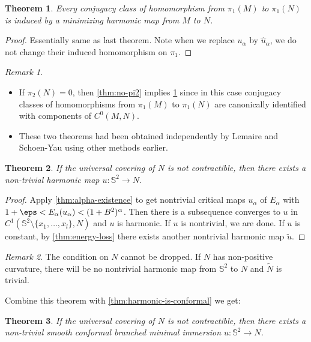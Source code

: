 \documentclass[UTF8,12pt]{article}
\theoremstyle{plain}\newtheorem{theorem}{Theorem}
\theoremstyle{definition}\newtheorem{definition}[theorem]{Definition}
\theoremstyle{definition}\newtheorem{example}[theorem]{Example}
\theoremstyle{plain}\newtheorem{axiom}[theorem]{Axiom}
\theoremstyle{plain}\newtheorem{assertion}[theorem]{Assertion}
\theoremstyle{plain}\newtheorem{corollary}[theorem]{Corollary}
\theoremstyle{plain}\newtheorem{lemma}[theorem]{Lemma}
\theoremstyle{plain}\newtheorem{proposition}[theorem]{Proposition}
\theoremstyle{plain}\newtheorem{prop}[theorem]{Proposition}
\theoremstyle{plain}\newtheorem{conjecture}[theorem]{Conjecture}
\theoremstyle{plain}\newtheorem{conj}[theorem]{Conjecture}
\theoremstyle{plain}\newtheorem{problem}[theorem]{Problem}
\theoremstyle{remark}\newtheorem{notation}[theorem]{Notation}
\theoremstyle{definition}\newtheorem*{question}{Question}
\theoremstyle{definition}\newtheorem*{answer}{Answer}
\theoremstyle{definition}\newtheorem*{goal}{Goal}
\theoremstyle{plain}\newtheorem*{application}{Application}
\theoremstyle{plain}\newtheorem*{exercise}{Exercise}
\theoremstyle{remark}\newtheorem*{remark}{Remark}
\theoremstyle{remark}\newtheorem*{note}{\small{Note}}
\numberwithin{equation}{section}
\numberwithin{theorem}{section}
\numberwithin{figure}{section}
\begin{document}
\begin{theorem}\label{thm:conj-class}
    Every conjugacy class of homomorphism from \(\pi_1(M)\) to \(\pi_1(N)\)
    is induced by a minimizing harmonic map from \(M\) to \(N\).
\end{theorem}
\begin{proof}
    Essentially same as last theorem. Note when we replace \(u_\alpha\) by \(\hat{u}_
    \alpha\), we do not change their induced homomorphism on \(\pi_1\).
\end{proof}
\begin{remark}\hfill
\begin{itemize}
\item If \(\pi_2(N)=0\), then \cref{thm:no-pi2} implies \cref{thm:conj-class} since
    in this case conjugacy classes of homomorphisms from \(\pi_1(M)\) to \(\pi_1(N)\)
    are canonically identified with components of \(C^0(M,N)\).
\item These two theorems had been obtained independently by Lemaire and Schoen-Yau
    using other methods earlier.
\end{itemize}
\end{remark}

\begin{theorem}
    If the universal covering of \(N\) is not contractible, then there exists
    a non-trivial harmonic map \(u\colon \mathbb{S}^2\to N\).
\end{theorem}
\begin{proof}
    Apply \cref{thm:alpha-existence} to get nontrivial critical maps \(u_\alpha\) of
    \(E_\alpha\) with \(1+\eps<E_\alpha(u_\alpha)<(1+B^2)^{\alpha}\). Then there is a
    subsequence converges to \(u\) in \(C^1(\mathbb{S}^2\setminus\{x_1,\ldots,x_l\}
    ,N)\) and \(u\) is harmonic. If \(u\) is nontrivial, we are done. If \(u\) is
    constant, by \cref{thm:energy-loss} there exists another nontrivial harmonic map
    \(\tilde{u}\).
\end{proof}
\begin{remark}
    The condition on \(N\) cannot be dropped. If \(N\) has non-positive curvature,
    there will be no nontrivial harmonic map from \(\mathbb{S}^2\) to \(N\) and
    \(\tilde{N}\) is trivial.
\end{remark}

Combine this theorem with \cref{thm:harmonic-is-conformal} we get:
\begin{theorem}
    If the universal covering of \(N\) is not contractible, then there exists a
    non-trivial smooth conformal branched minimal immersion \(u\colon \mathbb{S}^2
    \to N\).
\end{theorem}
\end{document}
